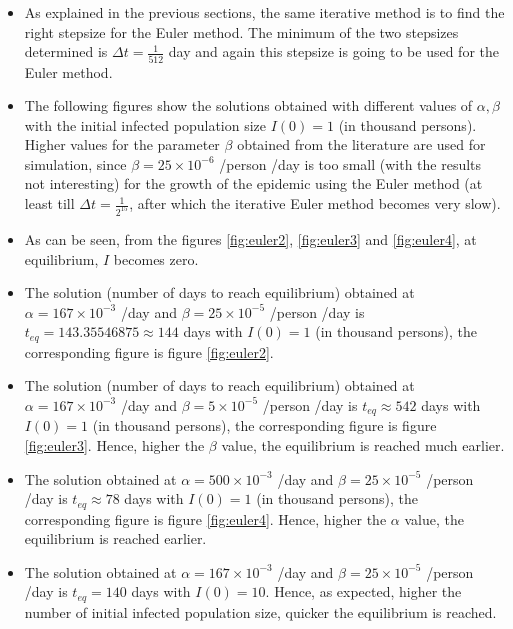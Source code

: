 \documentclass[11pt, a4paper, twoside]{report}
\begin{document}
\begin{itemize}
\item As explained in the previous sections, the same iterative method is to find the right stepsize for the Euler method. The minimum of the two stepsizes determined is $\Delta t = \frac{1}{512}$ day and again this stepsize is going to be used for the Euler method.  

\item The following figures show the solutions obtained with different values of $\alpha, \beta$ with the initial infected population size $I(0)=1$ (in thousand persons). Higher values for the parameter $\beta$ obtained from the literature are used for simulation, since $\beta=25 \times 10^{-6}$ /person /day is too small (with the results not interesting) for the growth of the epidemic using the Euler method (at least till $\Delta t=\frac{1}{2^15}$, after which the iterative Euler method becomes very slow).

\item As can be seen, from the figures \ref{fig:euler2}, \ref{fig:euler3} and \ref{fig:euler4}, at equilibrium, $I$ becomes zero. 

\item The solution (number of days to reach equilibrium) obtained at $\alpha=167 \times 10^{-3}$ /day and $\beta=25 \times 10^{-5}$ /person /day is $t_{eq}=143.35546875 \approx 144$ days with $I(0)=1$  (in thousand persons), the corresponding figure is figure \ref{fig:euler2}. 

\item The solution (number of days to reach equilibrium) obtained at $\alpha=167 \times 10^{-3}$ /day and $\beta=5 \times 10^{-5}$ /person /day is $t_{eq} \approx 542$ days with $I(0)=1$  (in thousand persons), the corresponding figure is figure \ref{fig:euler3}. Hence, higher the $\beta$ value, the equilibrium is reached much earlier. 

\item The solution obtained at $\alpha=500 \times 10^{-3}$ /day and $\beta=25 \times 10^{-5}$ /person /day is $t_{eq} \approx 78$ days with $I(0)=1$  (in thousand persons), the corresponding figure is figure \ref{fig:euler4}. Hence, higher the $\alpha$ value, the equilibrium is reached earlier. 

\item The solution obtained at $\alpha=167 \times 10^{-3}$ /day and $\beta=25 \times 10^{-5}$ /person /day is $t_{eq}=140$ days with $I(0)=10$. Hence, as expected, higher the number of initial infected population size, quicker the equilibrium is reached.


\end{itemize}
\end{document}
